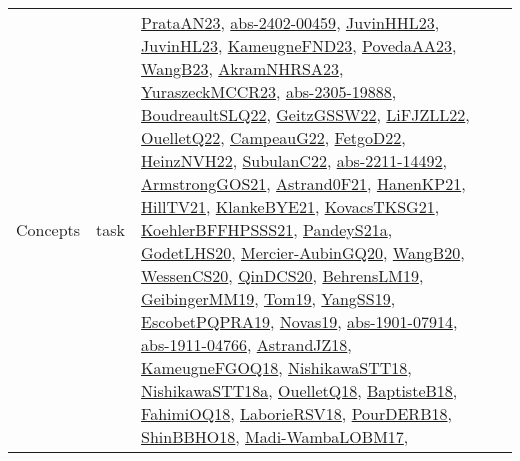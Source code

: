 {\begin{longtable}{lp{3cm}>{\raggedright}p{6cm}>{\raggedright}p{6cm}p{8cm}}
Concepts & task & \href{articles/PrataAN23.pdf}{PrataAN23}\cite{PrataAN23}, \href{articles/abs-2402-00459.pdf}{abs-2402-00459}\cite{abs-2402-00459}, \href{papers/JuvinHHL23.pdf}{JuvinHHL23}\cite{JuvinHHL23}, \href{papers/JuvinHL23.pdf}{JuvinHL23}\cite{JuvinHL23}, \href{papers/KameugneFND23.pdf}{KameugneFND23}\cite{KameugneFND23}, \href{papers/PovedaAA23.pdf}{PovedaAA23}\cite{PovedaAA23}, \href{papers/WangB23.pdf}{WangB23}\cite{WangB23}, \href{articles/AkramNHRSA23.pdf}{AkramNHRSA23}\cite{AkramNHRSA23}, \href{articles/YuraszeckMCCR23.pdf}{YuraszeckMCCR23}\cite{YuraszeckMCCR23}, \href{articles/abs-2305-19888.pdf}{abs-2305-19888}\cite{abs-2305-19888}, \href{papers/BoudreaultSLQ22.pdf}{BoudreaultSLQ22}\cite{BoudreaultSLQ22}, \href{papers/GeitzGSSW22.pdf}{GeitzGSSW22}\cite{GeitzGSSW22}, \href{papers/LiFJZLL22.pdf}{LiFJZLL22}\cite{LiFJZLL22}, \href{papers/OuelletQ22.pdf}{OuelletQ22}\cite{OuelletQ22}, \href{articles/CampeauG22.pdf}{CampeauG22}\cite{CampeauG22}, \href{articles/FetgoD22.pdf}{FetgoD22}\cite{FetgoD22}, \href{articles/HeinzNVH22.pdf}{HeinzNVH22}\cite{HeinzNVH22}, \href{articles/SubulanC22.pdf}{SubulanC22}\cite{SubulanC22}, \href{articles/abs-2211-14492.pdf}{abs-2211-14492}\cite{abs-2211-14492}, \href{papers/ArmstrongGOS21.pdf}{ArmstrongGOS21}\cite{ArmstrongGOS21}, \href{papers/Astrand0F21.pdf}{Astrand0F21}\cite{Astrand0F21}, \href{papers/HanenKP21.pdf}{HanenKP21}\cite{HanenKP21}, \href{papers/HillTV21.pdf}{HillTV21}\cite{HillTV21}, \href{papers/KlankeBYE21.pdf}{KlankeBYE21}\cite{KlankeBYE21}, \href{papers/KovacsTKSG21.pdf}{KovacsTKSG21}\cite{KovacsTKSG21}, \href{articles/KoehlerBFFHPSSS21.pdf}{KoehlerBFFHPSSS21}\cite{KoehlerBFFHPSSS21}, \href{articles/PandeyS21a.pdf}{PandeyS21a}\cite{PandeyS21a}, \href{papers/GodetLHS20.pdf}{GodetLHS20}\cite{GodetLHS20}, \href{papers/Mercier-AubinGQ20.pdf}{Mercier-AubinGQ20}\cite{Mercier-AubinGQ20}, \href{papers/WangB20.pdf}{WangB20}\cite{WangB20}, \href{papers/WessenCS20.pdf}{WessenCS20}\cite{WessenCS20}, \href{articles/QinDCS20.pdf}{QinDCS20}\cite{QinDCS20}, \href{papers/BehrensLM19.pdf}{BehrensLM19}\cite{BehrensLM19}, \href{papers/GeibingerMM19.pdf}{GeibingerMM19}\cite{GeibingerMM19}, \href{papers/Tom19.pdf}{Tom19}\cite{Tom19}, \href{papers/YangSS19.pdf}{YangSS19}\cite{YangSS19}, \href{articles/EscobetPQPRA19.pdf}{EscobetPQPRA19}\cite{EscobetPQPRA19}, \href{articles/Novas19.pdf}{Novas19}\cite{Novas19}, \href{articles/abs-1901-07914.pdf}{abs-1901-07914}\cite{abs-1901-07914}, \href{articles/abs-1911-04766.pdf}{abs-1911-04766}\cite{abs-1911-04766}, \href{papers/AstrandJZ18.pdf}{AstrandJZ18}\cite{AstrandJZ18}, \href{papers/KameugneFGOQ18.pdf}{KameugneFGOQ18}\cite{KameugneFGOQ18}, \href{papers/NishikawaSTT18.pdf}{NishikawaSTT18}\cite{NishikawaSTT18}, \href{papers/NishikawaSTT18a.pdf}{NishikawaSTT18a}\cite{NishikawaSTT18a}, \href{papers/OuelletQ18.pdf}{OuelletQ18}\cite{OuelletQ18}, \href{articles/BaptisteB18.pdf}{BaptisteB18}\cite{BaptisteB18}, \href{articles/FahimiOQ18.pdf}{FahimiOQ18}\cite{FahimiOQ18}, \href{articles/LaborieRSV18.pdf}{LaborieRSV18}\cite{LaborieRSV18}, \href{articles/PourDERB18.pdf}{PourDERB18}\cite{PourDERB18}, \href{articles/ShinBBHO18.pdf}{ShinBBHO18}\cite{ShinBBHO18}, \href{papers/Madi-WambaLOBM17.pdf}{Madi-WambaLOBM17}\cite{Madi-WambaLOBM17}, 
\end{longtable}}
